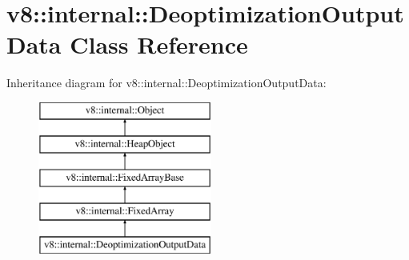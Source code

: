 \hypertarget{classv8_1_1internal_1_1_deoptimization_output_data}{}\section{v8\+:\+:internal\+:\+:Deoptimization\+Output\+Data Class Reference}
\label{classv8_1_1internal_1_1_deoptimization_output_data}
Inheritance diagram for v8\+:\+:internal\+:\+:Deoptimization\+Output\+Data\+:\begin{figure}[H]
\begin{center}
\leavevmode
\includegraphics[height=5.000000cm]{classv8_1_1internal_1_1_deoptimization_output_data}
\end{center}
\end{figure}
